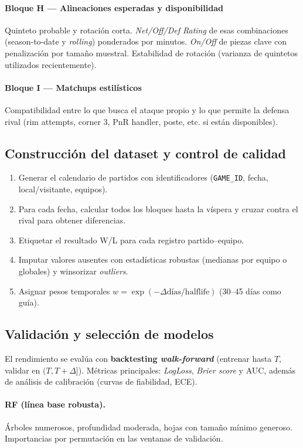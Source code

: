\paragraph{Bloque H — Alineaciones esperadas y disponibilidad}
Quinteto probable y rotación corta. 
\textit{Net/Off/Def Rating} de esas combinaciones (season-to-date y \textit{rolling}) ponderados por minutos.
\textit{On/Off} de piezas clave con penalización por tamaño muestral.
Estabilidad de rotación (varianza de quintetos utilizados recientemente).

\paragraph{Bloque I — Matchups estilísticos}
Compatibilidad entre lo que busca el ataque propio y lo que permite la defensa rival (rim attempts, corner 3, PnR handler, poste, etc. si están disponibles).

\subsection{Construcción del dataset y control de calidad}
\begin{enumerate}
  \item Generar el calendario de partidos con identificadores (\texttt{GAME\_ID}, fecha, local/visitante, equipos).
  \item Para cada fecha, calcular todos los bloques hasta la víspera y cruzar contra el rival para obtener diferencias.
  \item Etiquetar el resultado W/L para cada registro partido–equipo.
  \item Imputar valores ausentes con estadísticas robustas (medianas por equipo o globales) y winsorizar \textit{outliers}.
  \item Asignar pesos temporales $w=\exp(-\Delta\text{días}/\text{halflife})$ (30–45 días como guía).
\end{enumerate}

\subsection{Validación y selección de modelos}
El rendimiento se evalúa con \textbf{backtesting \textit{walk-forward}} (entrenar hasta $T$, validar en $(T, T+\Delta]$).
Métricas principales: \textit{LogLoss}, \textit{Brier score} y AUC, además de análisis de calibración (curvas de fiabilidad, ECE).

\paragraph{RF (línea base robusta).}
Árboles numerosos, profundidad moderada, hojas con tamaño mínimo generoso. 
Importancias por permutación en las ventanas de validación.

